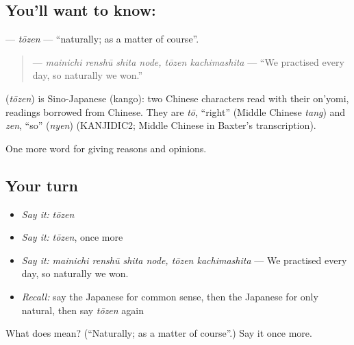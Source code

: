 \subsection*{You'll want to know: }
\textbf{} — \emph{tōzen} — \textquotedblleft{}naturally; as a matter of course\textquotedblright{}.

\begin{quote}
\textbf{  } — \emph{mainichi renshū shita node, tōzen kachimashita} — \textquotedblleft{}We practised every day, so naturally we won.\textquotedblright{}
\end{quote}

\begin{cousinweb}
\textbf{} (\emph{tōzen}) is Sino-Japanese (kango): two Chinese characters read with their on'yomi, readings borrowed from Chinese. They are \emph{tō}, \textquotedblleft{}right\textquotedblright{} (Middle Chinese \emph{tang}) and \emph{zen}, \textquotedblleft{}so\textquotedblright{} (\emph{nyen}) (KANJIDIC2; Middle Chinese in Baxter's transcription).
\end{cousinweb}

\begin{grammarlens}[title={What you've built}]
One more word for giving reasons and opinions.
\end{grammarlens}

\subsection*{Your turn}
\begin{itemize}
\raggedright
  \item \emph{Say it:} \emph{tōzen}
  \item \emph{Say it:} \emph{tōzen}, once more
  \item \emph{Say it:} \emph{mainichi renshū shita node, tōzen kachimashita} — We practised every day, so naturally we won.
  \item \emph{Recall:} say the Japanese for common sense, then the Japanese for only natural, then say \emph{tōzen} again
\end{itemize}

\begin{tcolorbox}[breakable,colback=teal!4,colframe=teal!35!black,title={Before you move on}]
What does  mean? (\textquotedblleft{}Naturally; as a matter of course\textquotedblright{}.) Say it once more.
\end{tcolorbox}

